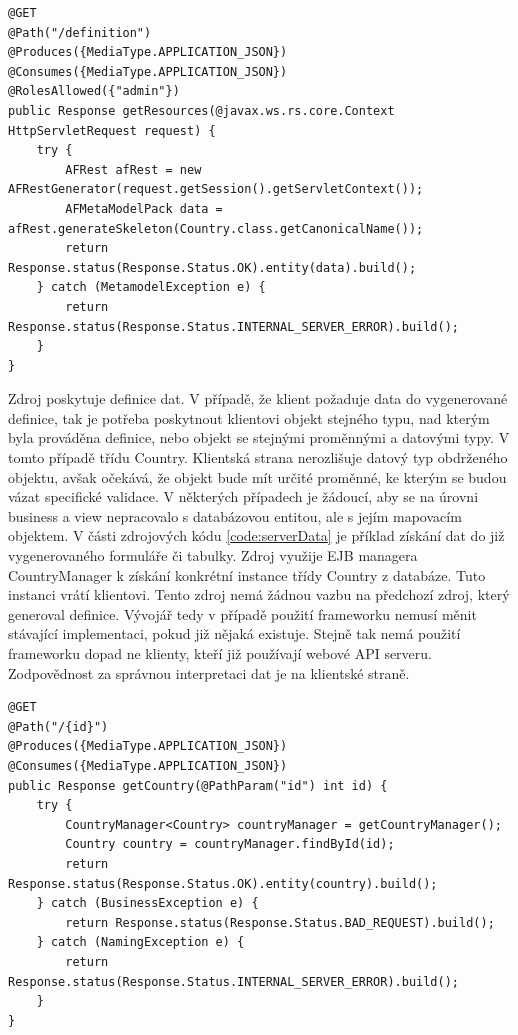 \begin{lstlisting}[caption={Ukázka zdroje, sloužícího k vygenerování definice třídy Country},
label={code:serverDefinition}]
@GET
@Path("/definition")
@Produces({MediaType.APPLICATION_JSON})
@Consumes({MediaType.APPLICATION_JSON})
@RolesAllowed({"admin"})
public Response getResources(@javax.ws.rs.core.Context HttpServletRequest request) {
	try {
		AFRest afRest = new AFRestGenerator(request.getSession().getServletContext());
		AFMetaModelPack data = afRest.generateSkeleton(Country.class.getCanonicalName());
		return Response.status(Response.Status.OK).entity(data).build();
	} catch (MetamodelException e) {
		return Response.status(Response.Status.INTERNAL_SERVER_ERROR).build();
	}
}
\end{lstlisting}
Zdroj poskytuje definice dat. V případě, že klient požaduje data do vygenerované definice, tak je potřeba poskytnout klientovi objekt stejného typu, nad kterým byla prováděna definice, nebo objekt se stejnými proměnnými a datovými typy. V tomto případě třídu Country. Klientská strana nerozlišuje datový typ obdrženého objektu, avšak očekává, že objekt bude mít určité proměnné, ke kterým se budou vázat specifické validace. V některých případech je žádoucí, aby se na úrovni business a view nepracovalo s databázovou entitou, ale s jejím mapovacím objektem. V části zdrojových kódu \ref{code:serverData} je příklad získání dat do již vygenerovaného formuláře či tabulky. Zdroj využije EJB \cite{javaEE} managera CountryManager k získání konkrétní instance třídy Country z databáze. Tuto instanci vrátí klientovi. Tento zdroj nemá žádnou vazbu na předchozí zdroj, který generoval definice. Vývojář tedy v případě použití frameworku nemusí měnit stávající implementaci, pokud již nějaká existuje. Stejně tak nemá použití frameworku dopad ne klienty, kteří již používají webové API serveru. Zodpovědnost za správnou interpretaci dat je na klientské straně.
\begin{lstlisting}[caption=Zdroj poskytující konkrétní instanci třídy Country,
label={code:serverData}]
@GET
@Path("/{id}")
@Produces({MediaType.APPLICATION_JSON})
@Consumes({MediaType.APPLICATION_JSON})
public Response getCountry(@PathParam("id") int id) {
	try {
		CountryManager<Country> countryManager = getCountryManager();
		Country country = countryManager.findById(id);
		return Response.status(Response.Status.OK).entity(country).build();
	} catch (BusinessException e) {
		return Response.status(Response.Status.BAD_REQUEST).build();
	} catch (NamingException e) {
		return Response.status(Response.Status.INTERNAL_SERVER_ERROR).build();
	}
}
\end{lstlisting}

